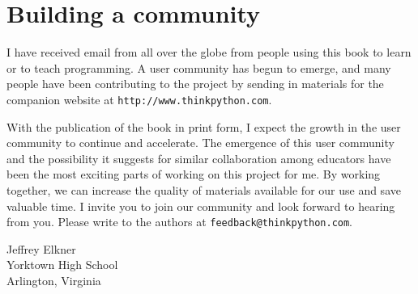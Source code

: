 \section*{Building a community}



I have received email from all over the globe from people using
this book to learn or to teach programming.  A user community has
begun to emerge, and many people have been contributing to the
project by sending in materials for the companion website at
{\tt http://www.thinkpython.com}.

With the publication of the book in print form, I expect the growth in
the user community to continue and accelerate.  The emergence of this
user community and the possibility it suggests for similar
collaboration among educators have been the most exciting parts of
working on this project for me.  By working together, we can increase
the quality of materials available for our use and save valuable time.
I invite you to join our community and look forward to hearing from
you.  Please write to the authors at {\tt feedback@thinkpython.com}.

\vspace{0.25in}
\begin{flushleft}
Jeffrey Elkner\\
Yorktown High School\\
Arlington, Virginia\\
\end{flushleft}
